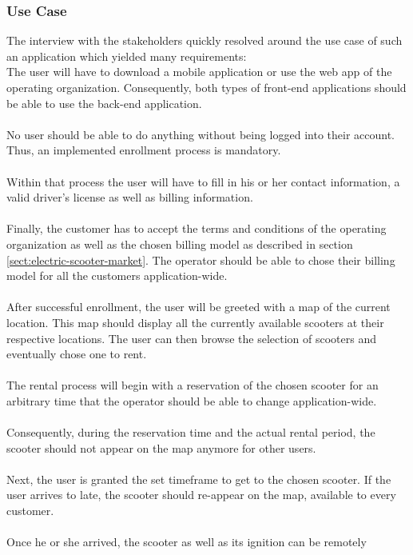 \documentclass[12pt,a4paper]{report}
\begin{document}
\subsubsection{Use Case}

The interview with the stakeholders quickly resolved around the use case
of such an application which yielded many requirements:\\

The user will have to download a mobile application or use the web app
of the operating organization. Consequently, both types of front-end applications
should be able to use the back-end application.\\\\
No user should be able to do anything without being logged into their account.
Thus, an implemented enrollment process is mandatory.\\\\
Within that process the user will have to fill in his or her
contact information, a valid driver's license as well as billing information.\\\\
Finally, the customer has to accept the terms and conditions of the operating
organization as well as the chosen billing model as described in
section \ref{sect:electric-scooter-market}. The operator should be able to chose
their billing model for all the customers application-wide.\\\\
After successful enrollment, the user will be greeted with a map of the current
location. This map should display all the currently available scooters at
their respective locations. The user can then browse the selection
of scooters and eventually chose one to rent.\\\\
The rental process will begin with a reservation of the chosen scooter for
an arbitrary time that the operator should be able to change application-wide.\\\\
Consequently, during the reservation time and the actual rental period,
the scooter should not appear on the map anymore for other users.\\\\
Next, the user is granted the set timeframe to get to the chosen scooter.
If the user arrives to late, the scooter should re-appear on the map,
available to every customer.\\\\
Once he or she arrived, the scooter as well as its ignition can be remotely
\end{document}
